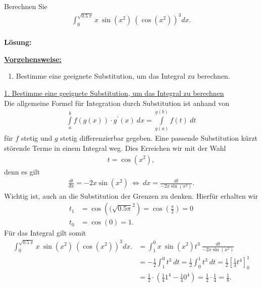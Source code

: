 \subsection*{}
Berechnen Sie 
\begin{align*}
\int_0^{\sqrt{0.5 \ \pi}} x \ \sin(x^2) \ \left(\cos(x^2)\right)^3 dx.
\end{align*}
\ \\
\textbf{Lösung:}
\begin{mdframed}
\underline{\textbf{Vorgehensweise:}}
\begin{enumerate}
\item Bestimme eine geeignete Substitution, um das Integral zu berechnen.
\end{enumerate}
\end{mdframed}

\underline{1. Bestimme eine geeignete Substitution, um das Integral zu berechnen}\\
Die allgemeine Formel für Integration durch Substitution ist anhand von
\begin{align*}
\int \limits_a^b f( g(x)) \cdot g^\prime(x) \  dx = 
\int \limits_{g(a)}^{g(b)} f(t) \ dt
\end{align*}
für $f$ stetig und $g$ stetig differenzierbar gegeben.
Eine passende Substitution kürzt störende Terme in einem Integral weg.
Dies Erreichen wir mit der Wahl
\begin{align*}
t = \cos(x^2),
\end{align*} 
denn es gilt
\begin{align*}
\frac{
dt}{dx} = -2x \sin(x^2)
\ \Leftrightarrow \
dx
= \frac{dt}{-2x \sin(x^2)}.
\end{align*}
Wichtig ist, auch an die Substitution der Grenzen zu denken.
Hierfür erhalten wir 
\begin{align*}
t_1 &= \cos\left( (\sqrt{0.5 \pi}^2\right)
= \cos \left(\frac{\pi }{2}\right) = 0\\
t_0 &= \cos(0) = 1.
\end{align*}
Für das Integral gilt somit
\begin{align*}
\int_0^{\sqrt{0.5 \ \pi}} x \ \sin(x^2) \ \left(\cos(x^2)\right)^3 dx.
&=
\int_1^{0}
x \ \sin(x^2) t^3 \ \frac{dt}{-2x \sin(x^2)}\\
&=
-\frac{1}{2}\int_1^{0}
t^3 \ dt
=
\frac{1}{2}\int_0^{1}
t^3 \ dt
=\frac{1}{2} 
\left[
\frac{1}{4} t^4
\right]_0^1\\
&=
\frac{1}{2} \cdot \left(\frac{1}{4} 1^4 - \frac{1}{4} 0^4\right) 
=
\frac{1}{2} \cdot \frac{1}{4} 
= \frac{1}{8}.
\end{align*}
\newpage
